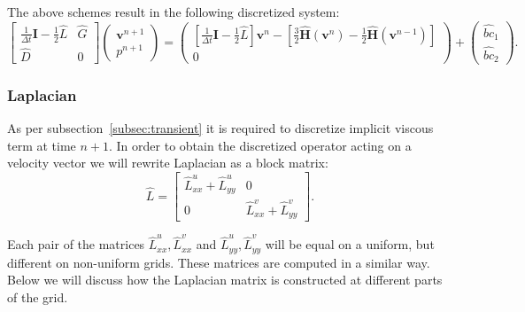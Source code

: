 \documentclass{article}
\begin{document}
The above schemes result in the following discretized system:
\begin{equation}\label{eqn:NSE-dsm-bl-system-schemes}
	\begin{bmatrix}
		\frac{1}{\Delta t}\mathbf{I}-\frac{1}{2}\hat{L} & \hat{G} \\
		\hat{D} & 0
	\end{bmatrix}
	\begin{pmatrix}
		\boldsymbol{v}^{n+1} \\ 
		p^{n+1}
	\end{pmatrix}
	=
	\begin{pmatrix}
		\left[\frac{1}{\Delta t}\mathbf{I}-\frac{1}{2}\hat{L}\right] \boldsymbol{v}^n - \left[\frac{3}{2}\hat{\mathbf{H}}(\boldsymbol{v}^n) - \frac{1}{2}\hat{\mathbf{H}}(\boldsymbol{v}^{n-1})\right]\\
		0
	\end{pmatrix}
	+
	\begin{pmatrix}
		\hat{bc}_1\\
		\hat{bc}_2
	\end{pmatrix}.
\end{equation}



\subsubsection{Laplacian}

As per subsection~\ref{subsec:transient} it is required to discretize implicit viscous term at time $n+1$. In order to obtain the discretized operator acting on a velocity vector we will rewrite Laplacian as a block matrix:
\begin{equation}
	\hat L=
	\begin{bmatrix}
  \hat{L}^u_{xx}+\hat{L}^u_{yy} & 0 \\
  0 & \hat{L}^v_{xx}+\hat{L}^v_{yy}
\end{bmatrix}.
\end{equation}

Each pair of the matrices $\hat{L}^u_{xx},\hat{L}^v_{xx}$ and $\hat{L}^u_{yy},\hat{L}^v_{yy}$ will be equal on a uniform, but different on non-uniform grids. These matrices are computed in a similar way. Below we will discuss how the Laplacian matrix is constructed at different parts of the grid.
\end{document}
